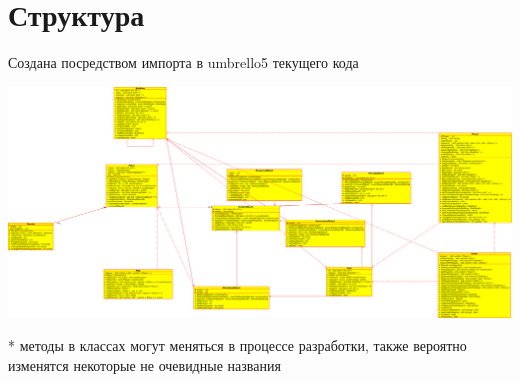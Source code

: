 \documentclass[a4paper,12pt,fleqn]{article} %
\newenvironment{changemargin}[2]{%
\begin{list}{}{%
\setlength{\topsep}{0pt}%
\setlength{\leftmargin}{#1}%
\setlength{\rightmargin}{#2}%
\setlength{\listparindent}{\parindent}%
\setlength{\itemindent}{\parindent}%
\setlength{\parsep}{\parskip}%
}%
\item[]}{\end{list}}
\begin{document}
\newpage
\section{Структура}
Создана посредством импорта в umbrello5 текущего кода

\begin{changemargin}{-3cm}{-2cm}
\includegraphics[width=1\linewidth]{structure}
\end{changemargin}
* методы в классах могут меняться в процессе разработки, также вероятно изменятся некоторые не очевидные названия
\end{document}
